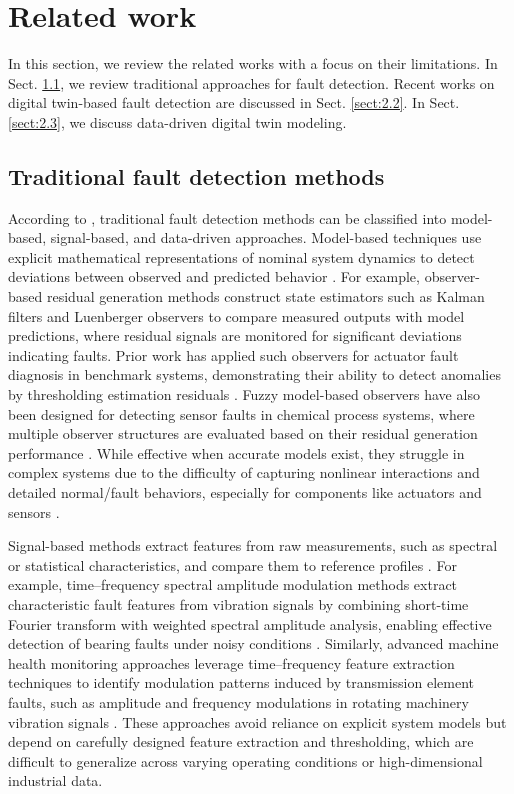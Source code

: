 \documentclass[a4paper,10pt]{cas-sc}%
\newcommand{\rev}[1]{#1}
\begin{document}
\section{Related work}\label{sec:2}

In this section, we review the related works with a focus on their limitations. In Sect. \ref{sec:2.1}, we review traditional approaches for \rev{fault detection}. Recent works on digital twin-based fault detection are discussed in Sect. \ref{sect:2.2}. In Sect. \ref{sect:2.3}, \rev{we} discuss data-driven digital twin modeling.

\subsection{Traditional fault detection methods}\label{sec:2.1}

According to \citep{9529495, leite2024fault}, traditional fault detection methods can be classified into model-based, signal-based, and data-driven approaches. Model-based techniques use explicit mathematical representations of nominal system dynamics to detect deviations between observed and predicted behavior \citep{ISERMANN1997709, marzat2012model}. For example, observer-based residual generation methods construct state estimators such as Kalman filters and Luenberger observers to compare measured outputs with model predictions, where residual signals are monitored for significant deviations indicating faults. Prior work has applied such observers for actuator fault diagnosis in benchmark systems, demonstrating their ability to detect anomalies by thresholding estimation residuals \citep{Zemali2023}. Fuzzy model-based observers have also been designed for detecting sensor faults in chemical process systems, where multiple observer structures are evaluated based on their residual generation performance \citep{BALLESTEROSMONCADA2015325}. While effective when accurate models exist, they struggle in complex systems due to the difficulty of capturing nonlinear interactions and detailed normal/fault behaviors, especially for components like actuators and sensors \citep{JUNG2019285}.

Signal-based methods extract features from raw measurements, such as spectral or statistical characteristics, and compare them to reference profiles \citep{aiorduachioaie2024comparative, wu2019survey}. For example, time--frequency spectral amplitude modulation methods extract characteristic fault features from vibration signals by combining short-time Fourier transform with weighted spectral amplitude analysis, enabling effective detection of bearing faults under noisy conditions \citep{JIANG2023109832}. Similarly, advanced machine health monitoring approaches leverage time--frequency feature extraction techniques to identify modulation patterns induced by transmission element faults, such as amplitude and frequency modulations in rotating machinery vibration signals \citep{ZHOU2023110489}. These approaches avoid reliance on explicit system models but depend on carefully designed feature extraction and thresholding, which are difficult to generalize across varying operating conditions or high-dimensional industrial data. 
\end{document}
